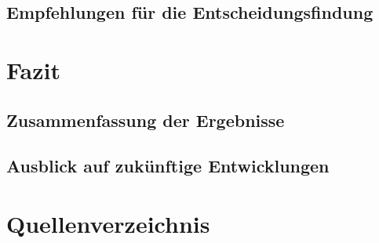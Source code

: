 \documentclass[12pt,bibtotoc]{article}
\newcounter{romanBeginningEnd} %
\begin{document}
		\subsection{Empfehlungen für die Entscheidungsfindung}

	\section{Fazit}
		\subsection{Zusammenfassung der Ergebnisse}
		\subsection{Ausblick auf zukünftige Entwicklungen}




	
	
	\newpage
	\setcounter{page}{\theromanBeginningEnd} %
	\setcounter{secnumdepth}{0} %
	\section{Quellenverzeichnis}
	\setcounter{secnumdepth}{3} %
	\printbibliography[heading=none]
	\newpage
	\appendix
	\clearpage
\end{document}
